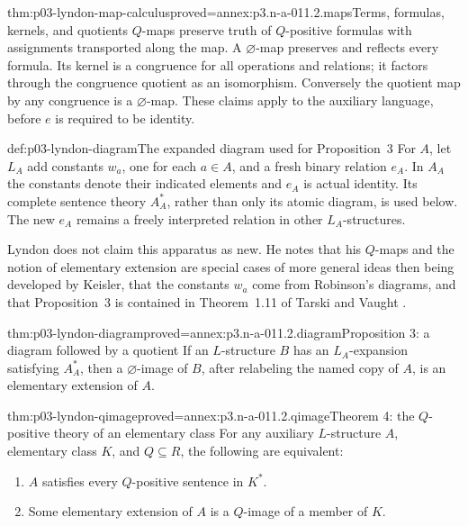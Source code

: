 \begin{hblemma}{thm:p03-lyndon-map-calculus}{proved=annex:p3.n-a-011.2.maps}{Terms, formulas, kernels, and quotients}
\(Q\)-maps preserve truth of \(Q\)-positive formulas with assignments
transported along the map. A \(\varnothing\)-map preserves and reflects
every formula. Its kernel is a congruence for all operations and relations;
it factors through the congruence quotient as an isomorphism. Conversely
the quotient map by any congruence is a \(\varnothing\)-map. These claims
apply to the auxiliary language, before \(e\) is required to be identity.
\end{hblemma}

\begin{hbdefinition}{def:p03-lyndon-diagram}{The expanded diagram used for Proposition~3}
For \(A\), let \(L_A\) add constants \(w_a\), one for each \(a\in A\),
and a fresh binary relation \(e_A\). In \(A_A\) the constants denote
their indicated elements and \(e_A\) is actual identity. Its complete
sentence theory \(A_A^*\), rather than only its atomic diagram, is used
below. The new \(e_A\) remains a freely interpreted relation in other
\(L_A\)-structures.
\end{hbdefinition}

Lyndon does not claim this apparatus as new. He notes that his \(Q\)-maps
and the notion of elementary extension are special cases of more general
ideas then being developed by Keisler, that the constants \(w_a\) come from
Robinson's diagrams, and that Proposition~3 is contained in Theorem~1.11 of
Tarski and Vaught \cite[p.~146, n.~4]{Lyndon1959}.

\begin{hblemma}{thm:p03-lyndon-diagram}{proved=annex:p3.n-a-011.2.diagram}{Proposition 3: a diagram followed by a quotient}
If an \(L\)-structure \(B\) has an \(L_A\)-expansion satisfying
\(A_A^*\), then a \(\varnothing\)-image of \(B\), after relabeling
the named copy of \(A\), is an elementary extension of \(A\).
\end{hblemma}

\begin{hbtheorem}{thm:p03-lyndon-qimage}{proved=annex:p3.n-a-011.2.qimage}{Theorem 4: the \(Q\)-positive theory of an elementary class}
For any auxiliary \(L\)-structure \(A\), elementary class \(K\),
and \(Q\subseteq R\), the following are equivalent:
\begin{enumerate}
\item \(A\) satisfies every \(Q\)-positive sentence in \(K^*\).
\item Some elementary extension of \(A\) is a \(Q\)-image of a member
      of \(K\).
\end{enumerate}
\end{hbtheorem}

